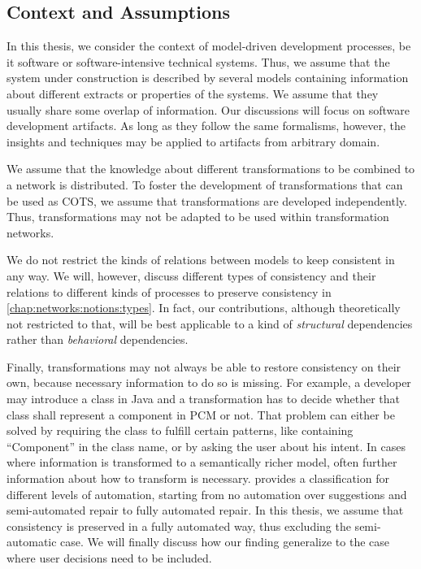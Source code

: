 \subsection{Context and Assumptions}
\label{chap:introduction:objective:assumptions}

In this thesis, we consider the context of model-driven development processes, be it software or software-intensive technical systems.
Thus, we assume that the system under construction is described by several models containing information about different extracts or properties of the systems.
We assume that they usually share some overlap of information.
Our discussions will focus on software development artifacts.
As long as they follow the same formalisms, however, the insights and techniques may be applied to artifacts from arbitrary domain.

We assume that the knowledge about different transformations to be combined to a network is distributed.
To foster the development of transformations that can be used as \gls{COTS}, we assume that transformations are developed independently.
Thus, transformations may not be adapted to be used within transformation networks.

We do not restrict the kinds of relations between models to keep consistent  in any way.
We will, however, discuss different types of consistency and their relations to different kinds of processes to preserve consistency in \autoref{chap:networks:notions:types}.
In fact, our contributions, although theoretically not restricted to that, will be best applicable to a kind of \emph{structural} dependencies rather than \emph{behavioral} dependencies.

Finally, transformations may not always be able to restore consistency on their own, because necessary information to do so is missing.
For example, a developer may introduce a class in Java and a transformation has to decide whether that class shall represent a component in \gls{PCM} or not.
That problem can either be solved by requiring the class to fulfill certain patterns, like containing \enquote{Component} in the class name, or by asking the user about his intent.
In cases where information is transformed to a semantically richer model, often further information about how to transform is necessary.
\textcite[p. 57]{kramer2017a} provides a classification for different levels of automation, starting from no automation over suggestions and semi-automated repair to fully automated repair.
In this thesis, we assume that consistency is preserved in a fully automated way, thus excluding the semi-automatic case.
We will finally discuss how our finding generalize to the case where user decisions need to be included.

